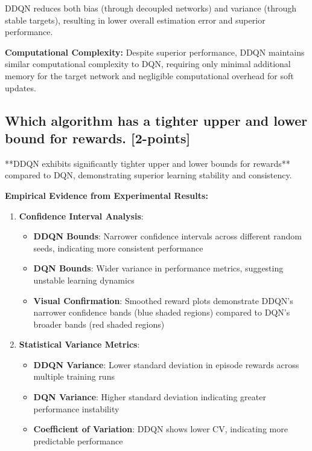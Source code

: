\documentclass[12pt]{article}
\begin{document}
{{{DDQN reduces both bias (through decoupled networks) and variance (through stable targets), resulting in lower overall estimation error and superior performance.

\textbf{Computational Complexity:}
Despite superior performance, DDQN maintains similar computational complexity to DQN, requiring only minimal additional memory for the target network and negligible computational overhead for soft updates.

\subsection{Which algorithm has a tighter upper and lower bound for rewards. [2-points]}

**DDQN exhibits significantly tighter upper and lower bounds for rewards** compared to DQN, demonstrating superior learning stability and consistency.

\textbf{Empirical Evidence from Experimental Results:}

\begin{enumerate}
    \item \textbf{Confidence Interval Analysis}:
    \begin{itemize}
        \item \textbf{DDQN Bounds}: Narrower confidence intervals across different random seeds, indicating more consistent performance
        \item \textbf{DQN Bounds}: Wider variance in performance metrics, suggesting unstable learning dynamics
        \item \textbf{Visual Confirmation}: Smoothed reward plots demonstrate DDQN's narrower confidence bands (blue shaded regions) compared to DQN's broader bands (red shaded regions)
    \end{itemize}
    
    \item \textbf{Statistical Variance Metrics}:
    \begin{itemize}
        \item \textbf{DDQN Variance}: Lower standard deviation in episode rewards across multiple training runs
        \item \textbf{DQN Variance}: Higher standard deviation indicating greater performance instability
        \item \textbf{Coefficient of Variation}: DDQN shows lower CV, indicating more predictable performance
    \end{itemize}
\end{enumerate}

}}}
\end{document}
